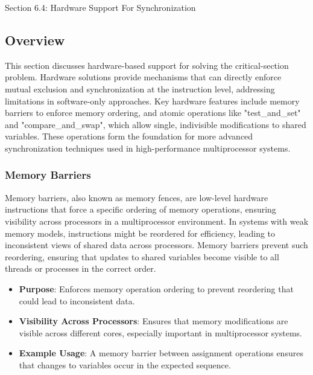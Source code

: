 \begin{notes}{Section 6.4: Hardware Support For Synchronization}
    \subsection*{Overview}

    This section discusses hardware-based support for solving the critical-section problem. Hardware solutions provide mechanisms that can directly enforce mutual exclusion and synchronization at the 
    instruction level, addressing limitations in software-only approaches. Key hardware features include memory barriers to enforce memory ordering, and atomic operations like "test\_and\_set" and 
    "compare\_and\_swap", which allow single, indivisible modifications to shared variables. These operations form the foundation for more advanced synchronization techniques used in high-performance multiprocessor systems.
    
    \subsubsection*{Memory Barriers}
    
    Memory barriers, also known as memory fences, are low-level hardware instructions that force a specific ordering of memory operations, ensuring visibility across processors in a multiprocessor 
    environment. In systems with weak memory models, instructions might be reordered for efficiency, leading to inconsistent views of shared data across processors. Memory barriers prevent such 
    reordering, ensuring that updates to shared variables become visible to all threads or processes in the correct order.
    
    \begin{highlight}
    
        \begin{itemize}
            \item \textbf{Purpose}: Enforces memory operation ordering to prevent reordering that could lead to inconsistent data.
            \item \textbf{Visibility Across Processors}: Ensures that memory modifications are visible across different cores, especially important in multiprocessor systems.
            \item \textbf{Example Usage}: A memory barrier between assignment operations ensures that changes to variables occur in the expected sequence.
        \end{itemize}
    

\end{highlight}
\end{notes}
